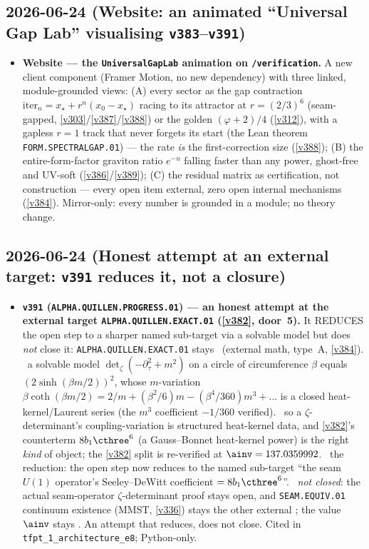 \subsection*{2026-06-24 (Website: an animated ``Universal Gap Lab'' visualising \texttt{v383}--\texttt{v391})}
\begin{itemize}
\item \textbf{Website --- the \texttt{UniversalGapLab} animation on \texttt{/verification}.} A new client
component (Framer Motion, no new dependency) with three linked, module-grounded views: (A) every sector as the
gap contraction $\mathrm{iter}_n=x_\star+r^n(x_0-x_\star)$ racing to its attractor at $r=(2/3)^6$ (seam-gapped,
\vref{v303}/\vref{v387}/\vref{v388}) or the golden $(\varphi+2)/4$ (\vref{v312}), with a gapless $r=1$ track that
never forgets its start (the Lean theorem \texttt{FORM.SPECTRALGAP.01}) --- the rate \emph{is} the first-correction
size (\vref{v388}); (B) the entire-form-factor graviton ratio $e^{-u}$ falling faster than any power, ghost-free and
UV-soft (\vref{v386}/\vref{v389}); (C) the residual matrix as certification, not construction --- every open item
external, zero open internal mechanisms (\vref{v384}). Mirror-only: every number is grounded in a module; no theory
change.
\end{itemize}

\subsection*{2026-06-24 (Honest attempt at an external target: \texttt{v391} reduces it, not a closure)}
\begin{itemize}
\item \textbf{\texttt{v391} (\texttt{ALPHA.QUILLEN.PROGRESS.01}) --- an honest attempt at the external target
\texttt{ALPHA.QUILLEN.EXACT.01} (\vref{v382}, door~5).} It REDUCES the open step to a sharper named sub-target via a
solvable model but does \emph{not} close it: \texttt{ALPHA.QUILLEN.EXACT.01} stays \mO\ (external math, type~A,
\vref{v384}). \mE\ a solvable model $\det_\zeta(-\partial_\tau^2+m^2)$ on a circle of circumference $\beta$ equals
$(2\sinh(\beta m/2))^2$, whose $m$-variation $\beta\coth(\beta m/2)=2/m+(\beta^2/6)m-(\beta^4/360)m^3+\dots$ is a closed
heat-kernel/Laurent series (the $m^3$ coefficient $-1/360$ verified). \mE\ so a $\zeta$-determinant's coupling-variation
is structured heat-kernel data, and \vref{v382}'s counterterm $8b_1\cthree^6$ (a Gauss--Bonnet heat-kernel power) is the
right \emph{kind} of object; the \vref{v382} split is re-verified at $\ainv=137.0359992$. \mE\ the reduction: the open
step now reduces to the named sub-target ``the seam $U(1)$ operator's Seeley--DeWitt coefficient $=8b_1\cthree^6$''.
\mO\ \emph{not closed}: the actual seam-operator $\zeta$-determinant proof stays open, and \texttt{SEAM.EQUIV.01}
continuum existence (MMST, \vref{v336}) stays the other external \mO; the value $\ainv$ stays \mE. An attempt that
reduces, does not close. Cited in \texttt{tfpt\_1\_architecture\_e8}; Python-only.
\end{itemize}

